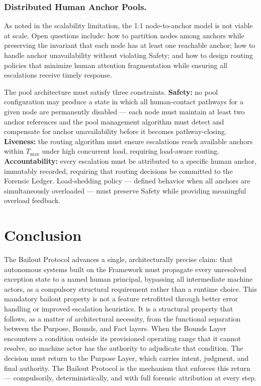 \subsubsection{Distributed Human Anchor Pools.}
As noted in the scalability limitation, the 1:1 node-to-anchor model is not viable at scale. Open questions include: how to partition nodes among anchors while preserving the invariant that each node has at least one reachable anchor; how to handle anchor unavailability without violating Safety; and how to design routing policies that minimize human attention fragmentation while ensuring all escalations receive timely response.

The pool architecture must satisfy three constraints. \textbf{Safety:} no pool configuration may produce a state in which all human-contact pathways for a given node are permanently disabled — each node must maintain at least two anchor references and the pool management algorithm must detect and compensate for anchor unavailability before it becomes pathway-closing. \textbf{Liveness:} the routing algorithm must ensure escalations reach available anchors within $T_{\max}$ under high concurrent load, requiring load-aware routing. \textbf{Accountability:} every escalation must be attributed to a specific human anchor, immutably recorded, requiring that routing decisions be committed to the Forensic Ledger. Load-shedding policy — defined behavior when all anchors are simultaneously overloaded — must preserve Safety while providing meaningful overload feedback.

\section{Conclusion}\label{sec:conclusion}

The Bailout Protocol advances a single, architecturally precise claim: that autonomous systems built on the \bxthree{} Framework must propagate every unresolved exception state to a named human principal, bypassing all intermediate machine actors, as a compulsory structural requirement rather than a runtime choice. This mandatory bailout property is not a feature retrofitted through better error handling or improved escalation heuristics. It is a structural property that follows, as a matter of architectural necessity, from the functional separation between the Purpose, Bounds, and Fact layers. When the Bounds Layer encounters a condition outside its provisioned operating range that it cannot resolve, no machine actor has the authority to adjudicate that condition. The decision must return to the Purpose Layer, which carries intent, judgment, and final authority. The Bailout Protocol is the mechanism that enforces this return — compulsorily, deterministically, and with full forensic attribution at every step.

